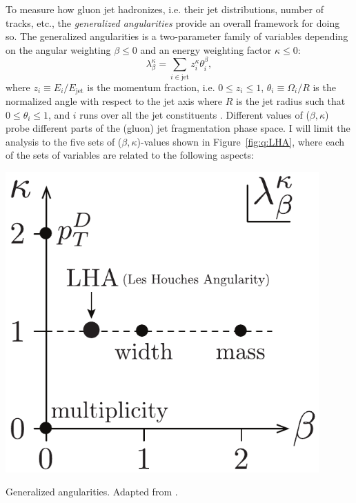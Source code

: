 To measure how gluon jet hadronizes, i.e. their jet distributions, number of tracks, etc., the \emph{generalized angularities} provide an overall framework for doing so. The generalized angularities is a two-parameter family of variables depending on the angular weighting $\beta \leq 0$ and an energy weighting factor $\kappa \leq 0$:
\begin{equation}
  \lambda_\beta^\kappa = \sum_{i \in \mathrm{jet}} z_i^\kappa \theta_i^\beta,
\end{equation}
where $z_i \equiv E_i / E_\mathrm{jet}$ is the momentum fraction, i.e. $0 \leq z_i \leq 1$, $\theta_i \equiv \Omega_i / R$ is the normalized angle with respect to the jet axis where $R$ is the jet radius such that $0 \leq \theta_i \leq 1$, and $i$ runs over all the jet constituents \citep{grasSystematicsQuarkGluon2017,larkoskiGainingMutualInformation2014}. Different values of ($\beta, \kappa$) probe different parts of the (gluon) jet fragmentation phase space. I will limit the analysis to the five sets of ($\beta, \kappa$)-values shown in Figure~\ref{fig:q:LHA}, where each of the sets of variables are related to the following aspects:

\begin{marginfigure}[5.5cm]
  \centerfloat
  \includegraphics[width=0.9\textwidth]{figures/LHA/LHA.pdf}
  \caption[Generalized Angularities]
          {Generalized angularities. Adapted from \citet{larkoskiGainingMutualInformation2014}. } 
  \label{fig:q:LHA}
\end{marginfigure}

